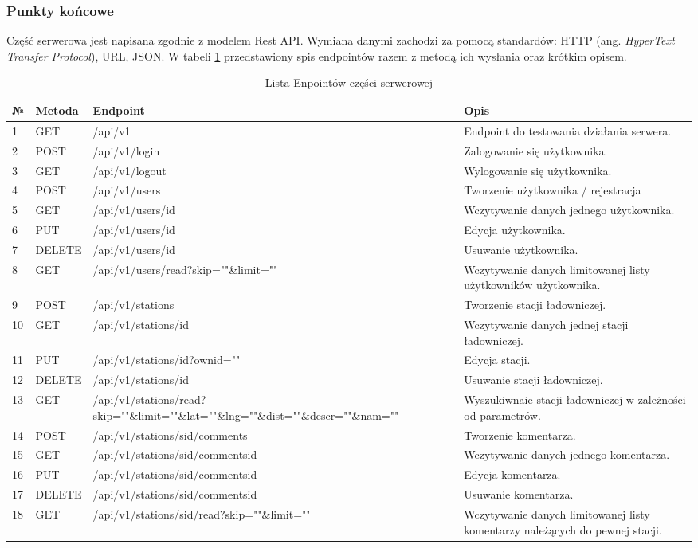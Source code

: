 \subsubsection{Punkty końcowe}
Część serwerowa jest napisana zgodnie z modelem Rest API. Wymiana danymi zachodzi za pomocą standardów: HTTP (ang. \textit{HyperText Transfer Protocol}), URL, JSON.
W tabeli \ref{tab:endpoints} przedstawiony spis endpointów razem z metodą ich wysłania oraz krótkim opisem.
\begin{table}[htb] \small
    \caption{Lista Enpointów części serwerowej}
    \label{tab:endpoints}
    \begin{tabularx}{\linewidth}{| m{0.45cm} | m{1.5cm} | m{6cm} | X |}
    \hline
    № & Metoda & Endpoint & Opis \\
    \hline
    1 & GET & /api/v1 & Endpoint do testowania działania serwera. \\
    \hline
    2 & POST & /api/v1/login & Zalogowanie się użytkownika. \\
    \hline
    3 & GET & /api/v1/logout & Wylogowanie się użytkownika. \\
    \hline
    4 & POST & /api/v1/users & Tworzenie użytkownika / rejestracja \\
    \hline
    5 & GET & /api/v1/users/{id} & Wczytywanie danych jednego użytkownika. \\
    \hline
    6 & PUT & /api/v1/users/{id} & Edycja użytkownika. \\
    \hline
    7 & DELETE & /api/v1/users/{id} & Usuwanie użytkownika. \\
    \hline
    8 & GET & /api/v1/users/read?skip=""\&limit="" & Wczytywanie danych limitowanej listy użytkowników użytkownika. \\
    \hline
    9 & POST & /api/v1/stations & Tworzenie stacji ładowniczej. \\
    \hline
    10 & GET & /api/v1/stations/{id} & Wczytywanie danych jednej stacji ładowniczej. \\
    \hline
    11 & PUT & /api/v1/stations/{id}?ownid="" & Edycja stacji. \\
    \hline
    12 & DELETE & /api/v1/stations/{id} & Usuwanie stacji ładowniczej. \\
    \hline
    13 & GET & /api/v1/stations/read?skip=""\&limit=""\&lat=""\&lng=""\&dist=""\&descr=""\&nam="" & Wyszukiwnaie stacji ładowniczej w zależności od parametrów. \\
    \hline
    14 & POST & /api/v1/stations/{sid}/comments & Tworzenie komentarza. \\
    \hline
    15 & GET & /api/v1/stations/{sid}/comments{id} & Wczytywanie danych jednego komentarza. \\
    \hline
    16 & PUT & /api/v1/stations/{sid}/comments{id} & Edycja komentarza. \\
    \hline
    17 & DELETE & /api/v1/stations/{sid}/comments{id} & Usuwanie komentarza. \\
    \hline
    18 & GET & /api/v1/stations/{sid}/read?skip=""\&limit="" & Wczytywanie danych limitowanej listy komentarzy należących do pewnej stacji. \\
    \hline
    \end{tabularx}
\end{table}

